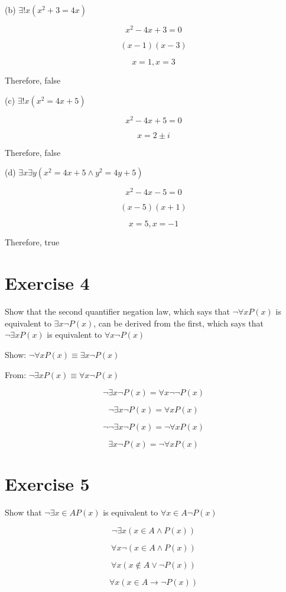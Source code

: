 \documentclass[11pt]{article}
\newcommand{\then}{\rightarrow}
\begin{document}
\noindent (b) $\exists! x(x^2 + 3 = 4x)$

$$x^2 - 4x + 3 = 0$$

$$(x-1)(x-3)$$

$$x = 1, x = 3$$

Therefore, false 

\noindent (c) $\exists! x(x^2 = 4x + 5)$

$$x^2 - 4x + 5 = 0$$

$$x = 2 \pm i$$

Therefore, false 

\noindent (d) $\exists x \exists y (x^2 = 4x + 5 \wedge y^2 = 4y + 5)$

$$x^2 - 4x - 5 = 0$$

$$(x-5)(x+1)$$

$$x = 5, x = -1$$

Therefore, true 

\section*{Exercise 4}

Show that the second quantifier negation law, which says that 
$\neg \forall x P(x)$ is equivalent to $\exists x \neg P(x)$, can be derived
from the first, which says that $\neg \exists x P(x)$ is equivalent to 
$\forall x \neg P(x)$

Show: $\neg \forall x P(x) \equiv \exists x \neg P(x)$

From: $\neg \exists x P(x) \equiv \forall x \neg P(x)$

$$\neg \exists x \neg P(x) = \forall x \neg \neg P(x)$$

$$\neg \exists x \neg P(x) = \forall x P(x)$$

$$\neg \neg \exists x \neg P(x) = \neg \forall x P(x)$$

$$\exists x \neg P(x) = \neg \forall x P(x)$$

\section*{Exercise 5}

Show that $\neg \exists x \in A P(x)$ is equivalent to 
$\forall x \in A \neg P(x)$

$$\neg \exists x (x \in A \wedge P(x))$$

$$\forall x \neg (x \in A \wedge P(x))$$

$$\forall x (x \notin A \vee \neg P(x))$$

$$\forall x (x \in A \then \neg P(x))$$
\end{document}
